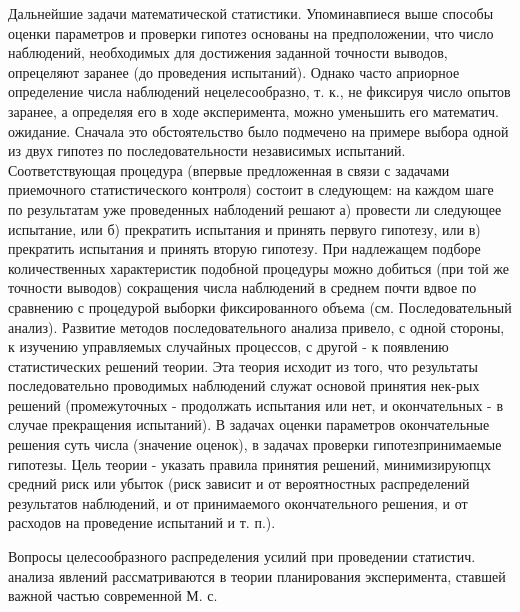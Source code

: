 \documentclass[10pt]{article}
\begin{document}
Дальнейшие задачи математической статистики. Упоминавпиеся выше способы оценки параметров и проверки гипотез основаны на предположении, что число наблюдений, необходимых для достижения заданной точности выводов, опрецеляют заранее (до проведения испытаний). Однако часто априорное определение числа наблюдений нецелесообразно, т. к., не фиксируя число опытов заранее, а определяя его в ходе әксперимента, можно уменьшить его математич. ожидание. Сначала это обстоятельство было подмечено на примере выбора одной из двух гипотез по последовательности независимых испытаний. Соответствующая процедура (впервые предложенная в связи с задачами приемочного статистического контроля) состоит в следующем: на каждом шаге по результатам уже проведенных наблодений решают а) провести ли следующее испытание, или б) прекратить испытания и принять первуго гипотезу, или в) прекратить испытания и принять вторую гипотезу. При надлежащем подборе количественных характеристик подобной процедуры можно добиться (при той же точности выводов) сокращения числа наблюдений в среднем почти вдвое по сравнению с процедурой выборки фиксированного объема (см. Последовательный анализ). Развитие методов последовательного анализа привело, с одной стороны, к изучению управляемых случайных процессов, с другой - к появлению статистических решений теории. Эта теория исходит из того, что результаты последовательно проводимых наблюдений служат основой принятия нек-рых решений (промежуточных - продолжать испытания или нет, и окончательных - в случае прекращения испытаний). В задачах оценки параметров окончательные решения суть числа (значение оценок), в задачах проверки гипотезпринимаемые гипотезы. Цель теории - указать правила принятия решений, минимизируюпцх средний риск или убыток (риск зависит и от вероятностных распределений результатов наблюдений, и от принимаемого окончательного решения, и от расходов на проведение испытаний и т. п.).



Вопросы целесообразного распределения усилий при проведении статистич. анализа явлений рассматриваются в теории планирования эксперимента, ставшей важной частью современной М. с.
\end{document}
